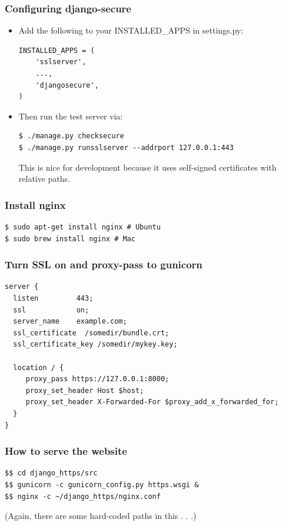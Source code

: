 \documentclass[9pt]{beamer}
\begin{document}
\begin{frame}[fragile]
\frametitle{Configuring django-secure}
\begin{itemize}
\item Add the following to your INSTALLED\_APPS in settings.py:
\begin{verbatim}
INSTALLED_APPS = (
    'sslserver',
    ...,
    'djangosecure',
)
\end{verbatim}
\pause
\item Then run the test server via:
\begin{verbatim}
$ ./manage.py checksecure 
$ ./manage.py runsslserver --addrport 127.0.0.1:443
\end{verbatim}
This is nice for development because it uses self-signed certificates with relative paths.
\end{itemize}
\end{frame}

\begin{frame}[fragile]
\frametitle{Install nginx}
\begin{verbatim}
$ sudo apt-get install nginx # Ubuntu
$ sudo brew install nginx # Mac
\end{verbatim}
\end{frame}

\begin{frame}[fragile]
\frametitle{Turn SSL on and proxy-pass to gunicorn}
\begin{verbatim}
server {
  listen         443;
  ssl            on;
  server_name    example.com;
  ssl_certificate  /somedir/bundle.crt;
  ssl_certificate_key /somedir/mykey.key;

  location / {
     proxy_pass https://127.0.0.1:8000;
     proxy_set_header Host $host;
     proxy_set_header X-Forwarded-For $proxy_add_x_forwarded_for;
  }
}
\end{verbatim}
\end{frame}

\begin{frame}[fragile]
\frametitle{How to serve the website}
\begin{verbatim}
$$ cd django_https/src
$$ gunicorn -c gunicorn_config.py https.wsgi &
$$ nginx -c ~/django_https/nginx.conf
\end{verbatim}
(Again, there are some hard-coded paths in this . . .)
\end{frame}
\end{document}

